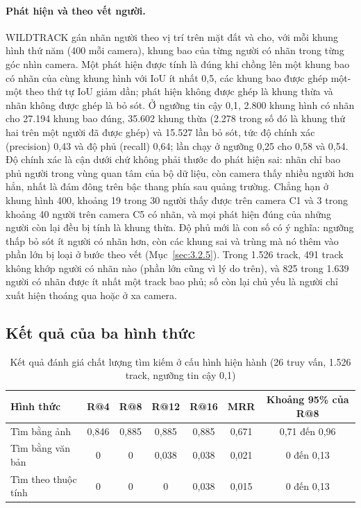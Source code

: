 \paragraph{Phát hiện và theo vết người.} WILDTRACK gán nhãn người theo vị trí trên mặt đất và cho, với mỗi khung hình thứ năm (400 mỗi camera), khung bao của từng người có nhãn trong từng góc nhìn camera. Một phát hiện được tính là đúng khi chồng lên một khung bao có nhãn của cùng khung hình với IoU ít nhất 0,5, các khung bao được ghép một-một theo thứ tự IoU giảm dần; phát hiện không được ghép là khung thừa và nhãn không được ghép là bỏ sót. Ở ngưỡng tin cậy 0,1, 2.800 khung hình có nhãn cho 27.194 khung bao đúng, 35.602 khung thừa (2.278 trong số đó là khung thứ hai trên một người đã được ghép) và 15.527 lần bỏ sót, tức độ chính xác (precision) 0,43 và độ phủ (recall) 0,64; lần chạy ở ngưỡng 0,25 cho 0,58 và 0,54. Độ chính xác là cận dưới chứ không phải thước đo phát hiện sai: nhãn chỉ bao phủ người trong vùng quan tâm của bộ dữ liệu, còn camera thấy nhiều người hơn hẳn, nhất là đám đông trên bậc thang phía sau quảng trường. Chẳng hạn ở khung hình 400, khoảng 19 trong 30 người thấy được trên camera C1 và 3 trong khoảng 40 người trên camera C5 có nhãn, và mọi phát hiện đúng của những người còn lại đều bị tính là khung thừa. Độ phủ mới là con số có ý nghĩa: ngưỡng thấp bỏ sót ít người có nhãn hơn, còn các khung sai và trùng mà nó thêm vào phần lớn bị loại ở bước theo vết (Mục~\ref{sec:3.2.5}). Trong 1.526 track, 491 track không khớp người có nhãn nào (phần lớn cũng vì lý do trên), và 825 trong 1.639 người có nhãn được ít nhất một track bao phủ; số còn lại chủ yếu là người chỉ xuất hiện thoáng qua hoặc ở xa camera.

\subsection{Kết quả của ba hình thức}

\begin{table}[H]
\centering
\caption{Kết quả đánh giá chất lượng tìm kiếm ở cấu hình hiện hành (26 truy vấn, 1.526 track, ngưỡng tin cậy 0,1)}
\label{tab:recall}
\begin{tabularx}{\textwidth}{|L|c|c|c|c|c|c|}
\hline
\textbf{Hình thức} & \textbf{R@4} & \textbf{R@8} & \textbf{R@12} & \textbf{R@16} & \textbf{MRR} & \textbf{Khoảng 95\% của R@8} \\
\hline
Tìm bằng ảnh & 0,846 & 0,885 & 0,885 & 0,885 & 0,671 & 0,71 đến 0,96 \\
\hline
Tìm bằng văn bản & 0 & 0 & 0,038 & 0,038 & 0,021 & 0 đến 0,13 \\
\hline
Tìm theo thuộc tính & 0 & 0 & 0 & 0,038 & 0,015 & 0 đến 0,13 \\
\hline
\end{tabularx}
\end{table}

